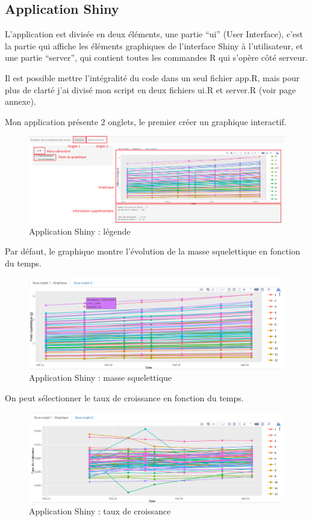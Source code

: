 \documentclass[]{report}
\begin{document}
\subsection{Application Shiny}\label{application-shiny}

L'application est divisée en deux éléments, une partie ``ui'' (User
Interface), c'est la partie qui affiche les éléments graphiques de
l'interface Shiny à l'utilisateur, et une partie ``server'', qui
contient toutes les commandes R qui s'opère côté serveur.

Il est possible mettre l'intégralité du code dans un seul fichier app.R,
mais pour plus de clarté j'ai divisé mon script en deux fichiers ui.R et
server.R (voir page annexe).

Mon application présente 2 onglets, le premier créer un graphique
interactif.

\begin{figure}[h!]
\includegraphics[]{../image/shiny1.PNG}
\caption{Application Shiny : légende}
\end{figure}

Par défaut, le graphique montre l'évolution de la masse squelettique en
fonction du temps.

\begin{figure}[h!]
\includegraphics[]{../image/shiny2.PNG}
\caption{Application Shiny : masse squelettique}
\end{figure}

On peut sélectionner le taux de croissance en fonction du temps.

\begin{figure}[h!]
\includegraphics[]{../image/shiny3.PNG}
\caption{Application Shiny : taux de croissance}
\end{figure}
\end{document}
